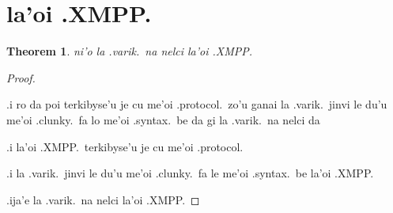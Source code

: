 \documentclass{article}
\newtheorem{thm}{Theorem}
\begin{document}
\section{la'oi .XMPP.}
\begin{thm}
	ni'o la .varik.\ na nelci la'oi .XMPP.
\end{thm}
\begin{proof}
	${}$

	.i ro da poi terkibyse'u je cu me'oi .protocol.\ zo'u ganai la .varik.\ jinvi le du'u me'oi .clunky.\ fa lo me'oi .syntax.\ be da gi la .varik.\ na nelci da

	.i la'oi .XMPP.\ terkibyse'u je cu me'oi .protocol.

	.i la .varik.\ jinvi le du'u me'oi .clunky.\ fa le me'oi .syntax.\ be la'oi .XMPP.

	.ija'e la .varik.\ na nelci la'oi .XMPP.
\end{proof}
\end{document}
